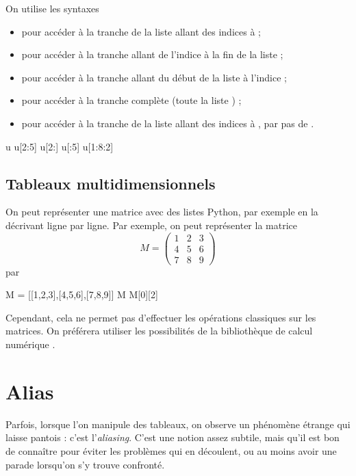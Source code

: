 On utilise les  syntaxes 
\begin{itemize}
  \item {} pour accéder à la tranche de la liste  allant des indices  à  ;
  \item {} pour accéder à la tranche allant de l'indice  à la fin de la liste  ;
  \item {} pour accéder à la tranche allant du début de la liste  à l'indice ;
  \item {} pour accéder à la tranche complète (toute la liste ) ;
  \item {} pour accéder à la tranche de la liste  allant des indices  à , par pas de .
\end{itemize}
\begin{pyconsole}
u
u[2:5]
u[2:]
u[:5]
u[1:8:2]
\end{pyconsole}

\subsection{Tableaux multidimensionnels}

On peut représenter une matrice avec des listes Python, par exemple en la décrivant ligne par 
ligne. 
Par exemple, on peut représenter la matrice 
\begin{equation*}
  M=\begin{pmatrix}
    1&2&3 \\ 4&5&6 \\ 7&8&9
  \end{pmatrix}
\end{equation*}
par
\begin{pyconsole}
M = [[1,2,3],[4,5,6],[7,8,9]]
M
M[0][2]
\end{pyconsole}
Cependant, cela ne permet pas d'effectuer les opérations classiques sur les matrices. On préférera 
utiliser les possibilités de la bibliothèque de calcul numérique .

\section{Alias}

Parfois, lorsque l'on manipule des tableaux, on observe un phénomène étrange qui laisse pantois : 
c'est l'\emph{aliasing}. C'est une notion assez subtile, mais qu'il est bon de connaître pour 
éviter les problèmes qui en découlent, ou au moins avoir une parade lorsqu'on s'y trouve 
confronté.\\



